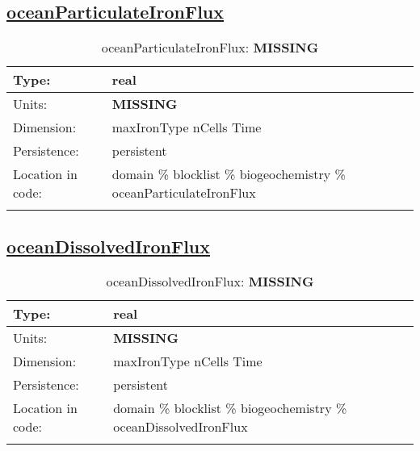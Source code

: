 \subsection[oceanParticulateIronFlux]{\hyperref[sec:var_tab_biogeochemistry]{oceanParticulateIronFlux}}
\label{subsec:var_sec_biogeochemistry_oceanParticulateIronFlux}
\begin{center}
\begin{longtable}{| p{2.0in} | p{4.0in} |}
        \hline 
        Type: & real \\
        \hline 
        Units: & {\bf \color{red} MISSING} \\
        \hline 
        Dimension: & maxIronType nCells Time \\
        \hline 
        Persistence: & persistent \\
        \hline 
         Location in code: & domain \% blocklist \% biogeochemistry \% oceanParticulateIronFlux \\
         \hline 
    \caption{oceanParticulateIronFlux: {\bf \color{red} MISSING}}
\end{longtable}
\end{center}
\subsection[oceanDissolvedIronFlux]{\hyperref[sec:var_tab_biogeochemistry]{oceanDissolvedIronFlux}}
\label{subsec:var_sec_biogeochemistry_oceanDissolvedIronFlux}
\begin{center}
\begin{longtable}{| p{2.0in} | p{4.0in} |}
        \hline 
        Type: & real \\
        \hline 
        Units: & {\bf \color{red} MISSING} \\
        \hline 
        Dimension: & maxIronType nCells Time \\
        \hline 
        Persistence: & persistent \\
        \hline 
         Location in code: & domain \% blocklist \% biogeochemistry \% oceanDissolvedIronFlux \\
         \hline 
    \caption{oceanDissolvedIronFlux: {\bf \color{red} MISSING}}
\end{longtable}
\end{center}
